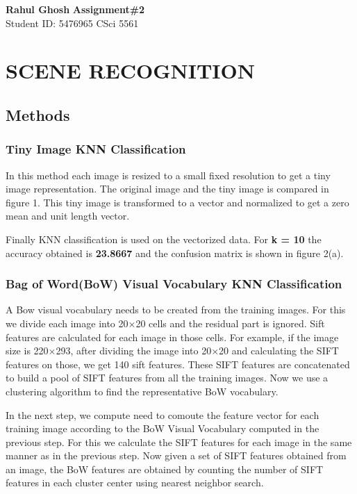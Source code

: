 \documentclass[letter, 11pt]{article}
\begin{document}
\noindent
\large \textbf{Rahul Ghosh} \hfill \textbf{Assignment\#2}\\
\normalsize Student ID: 5476965 \hfill CSci 5561\\

\section*{SCENE RECOGNITION}
\subsection*{Methods}
\subsubsection*{Tiny Image KNN Classification}
In this method each image is resized to a small fixed resolution to get a tiny image representation. The original image and the tiny image is compared in figure 1. This tiny image is transformed to a vector and normalized to get a zero mean and unit length vector. 

Finally KNN classification is used on the vectorized data. For \textbf{k = 10} the accuracy obtained is \textbf{23.8667} and the confusion matrix is shown in figure 2(a).

\subsubsection*{Bag of Word(BoW) Visual Vocabulary KNN Classification}
A Bow visual vocabulary needs to be created from the training images. For this we divide each image into 20$\times$20 cells and the residual part is ignored. Sift features are calculated for each image in those cells.  For example, if the image size is 220$\times$293, after dividing the image into 20$\times$20 and calculating the SIFT features on those, we get 140 sift features. These SIFT features are concatenated to build a pool of SIFT features from all the training images. Now we use a clustering algorithm to find the representative BoW vocabulary.

In the next step, we compute need to comoute the feature vector for each training image according to the  BoW Visual Vocabulary computed in the previous step. For this we calculate the SIFT features for each image in the same manner as in the previous step. Now given a set of SIFT features obtained from an image, the BoW features are obtained by
counting the number of SIFT features in each cluster center using nearest neighbor search.
\end{document}
